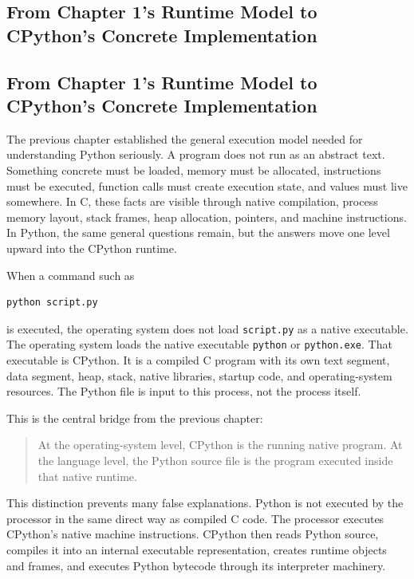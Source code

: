 \subsection{From Chapter 1's Runtime Model to CPython's Concrete Implementation}

\subsection{From Chapter 1's Runtime Model to CPython's Concrete Implementation}

The previous chapter established the general execution model needed for understanding Python seriously. A program does not run as an abstract text. Something concrete must be loaded, memory must be allocated, instructions must be executed, function calls must create execution state, and values must live somewhere. In C, these facts are visible through native compilation, process memory layout, stack frames, heap allocation, pointers, and machine instructions. In Python, the same general questions remain, but the answers move one level upward into the CPython runtime.

When a command such as

\begin{verbatim}
python script.py
\end{verbatim}

is executed, the operating system does not load \texttt{script.py} as a native executable. The operating system loads the native executable \texttt{python} or \texttt{python.exe}. That executable is CPython. It is a compiled C program with its own text segment, data segment, heap, stack, native libraries, startup code, and operating-system resources. The Python file is input to this process, not the process itself.

This is the central bridge from the previous chapter:

\begin{quote}
At the operating-system level, CPython is the running native program. At the language level, the Python source file is the program executed inside that native runtime.
\end{quote}

This distinction prevents many false explanations. Python is not executed by the processor in the same direct way as compiled C code. The processor executes CPython's native machine instructions. CPython then reads Python source, compiles it into an internal executable representation, creates runtime objects and frames, and executes Python bytecode through its interpreter machinery.

